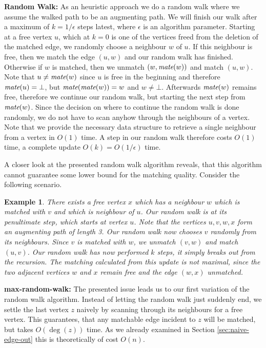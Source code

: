\documentclass{article}      %
\newtheorem{example}{Example}[subsection]
\DeclareMathOperator\mate{\emph{mate}}
\begin{document}
\bigskip \noindent
\textbf{Random Walk:} As an heuristic approach we do a random walk where we assume the walked path to be an augmenting path. We will finish our walk after a maximum of $k=1/\epsilon$ steps latest, where $\epsilon$ is an algorithm parameter. Starting at a free vertex $u$, which at $k=0$ is one of the vertices freed from the deletion of the matched edge, we randomly choose a neighbour $w$ of $u$. If this neighbour is free, then we match the edge $(u,w)$ and our random walk has finished. Otherwise if $w$ is matched, then we unmatch $(w, \mate(w))$ and match $(u,w)$. Note that $u \neq \mate(w)$ since $u$ is free in the beginning and therefore $\mate(u) = \bot$, but $\mate(\mate(w)) = w$ and $w \neq \bot$. Afterwards $\mate(w)$ remains free, therefore we continue our random walk, but starting the next step from $\mate(w)$. Since the decision on where to continue the random walk is done randomly, we do not have to scan anyhow through the neighbours of a vertex. Note that we provide the necessary data structure to retrieve a single neighbour from a vertex in $O(1)$ time. A step in our random walk therefore costs $O(1)$ time, a complete update $O(k) = O(1/\epsilon)$ time.

A closer look at the presented random walk algorithm reveals, that this algorithm cannot guarantee some lower bound for the matching quality. Consider the following scenario. 

\begin{example}
\label{ex:rw-not-max}
There exists a free vertex $x$ which has a neighbour $w$ which is matched with $v$ and which is neighbour of $u$. Our random walk is at its penultimate step, which starts at vertex $u$. Note that the vertices $u,v,w,x$ form an augmenting path of length 3. Our random walk now chooses $v$ randomly from its neighbours. Since $v$ is matched with $w$, we unmatch $(v,w)$ and match $(u,v)$. Our random walk has now performed $k$ steps, it simply breaks out from the recursion. The matching calculated from this update is not maximal, since the two adjacent vertices $w$ and $x$ remain free and the edge $(w,x)$ unmatched.
\end{example}

\noindent
\textbf{max-random-walk:} The presented issue leads us to our first variation of the random walk algorithm. Instead of letting the random walk just suddenly end, we settle the last vertex $z$ naively by scanning through its neighbours for a free vertex. This guarantees, that any matchable edge incident to $z$ will be matched, but takes $O(\deg(z))$ time. As we already examined in Section \ref{sec:naive-edge-out} this is theoretically of cost $O(n)$. %
\end{document}

